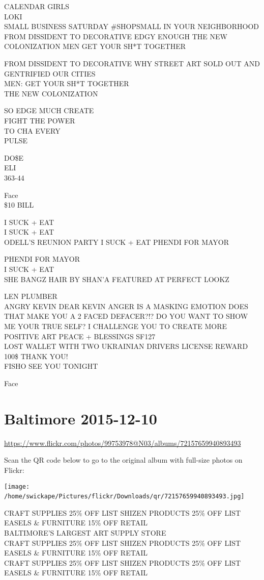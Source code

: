 \documentclass[10pt,letterpaper]{article}
\begin{document}
CALENDAR GIRLS\\
LOKI\\
SMALL BUSINESS SATURDAY \#SHOPSMALL IN YOUR NEIGHBORHOOD\\
FROM DISSIDENT TO DECORATIVE EDGY ENOUGH THE NEW COLONIZATION MEN GET YOUR SH*T TOGETHER

FROM DISSIDENT TO DECORATIVE WHY STREET ART SOLD OUT AND GENTRIFIED OUR CITIES\\
MEN: GET YOUR SH*T TOGETHER\\
THE NEW COLONIZATION

SO EDGE MUCH CREATE\\
FIGHT THE POWER\\
TO CHA EVERY\\
PULSE

DO\$E\\
ELI\\
363{-}44

Face\\
\$10 BILL

I SUCK + EAT\\
I SUCK + EAT\\
ODELL'S REUNION PARTY I SUCK + EAT PHENDI FOR MAYOR

PHENDI FOR MAYOR\\
I SUCK + EAT\\
SHE BANGZ HAIR BY SHAN'A FEATURED AT PERFECT LOOKZ

LEN PLUMBER\\
ANGRY KEVIN DEAR KEVIN ANGER IS A MASKING EMOTION DOES THAT MAKE YOU A 2 FACED DEFACER?!?  DO YOU WANT TO SHOW ME YOUR TRUE SELF?  I CHALLENGE YOU TO CREATE MORE POSITIVE ART PEACE + BLESSINGS SF127\\
LOST WALLET WITH TWO UKRAINIAN DRIVERS LICENSE REWARD 100\$ THANK YOU!\\
FISHO SEE YOU TONIGHT

Face
\

\section*{Baltimore 2015-12-10}

\url{https://www.flickr.com/photos/99753978@N03/albums/72157659940893493}

Scan the QR code below to go to the original album with full-size photos on Flickr:

\texttt{[image: /home/swickape/Pictures/flickr/Downloads/qr/72157659940893493.jpg]}
\

CRAFT SUPPLIES 25\% OFF LIST SHIZEN PRODUCTS 25\% OFF LIST EASELS \& FURNITURE 15\% OFF RETAIL\\
BALTIMORE'S LARGEST ART SUPPLY STORE\\
CRAFT SUPPLIES 25\% OFF LIST SHIZEN PRODUCTS 25\% OFF LIST EASELS \& FURNITURE 15\% OFF RETAIL\\
CRAFT SUPPLIES 25\% OFF LIST SHIZEN PRODUCTS 25\% OFF LIST EASELS \& FURNITURE 15\% OFF RETAIL
\end{document}
